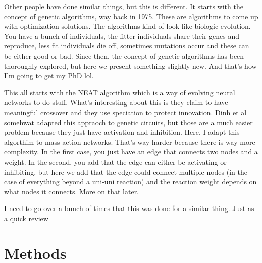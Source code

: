 \documentclass[12pt]{report}
\begin{document}
Other people have done similar things, but this is different. It starts with the concept of genetic algorithms, way back in 1975. These are algorithms to come up with optimization solutions. The algorithms kind of look like biologic evolution. You have a bunch of individuals, the fitter individuals share their genes and reproduce, less fit individuals die off, sometimes mutations occur and these can be either good or bad. Since then, the concept of genetic algorithms has been thoroughly explored, but here we present something slightly new. And that's how I'm going to get my PhD lol.

This all starts with the NEAT algorithm which is a way of evolving neural networks to do stuff.  What's interesting about this is they claim to have meaningful crossover and they use speciation to protect innovation. Dinh et al somehwat adapted this appraoch to genetic circuits, but those are a much easier problem because they just have activation and inhibition. Here, I adapt this algorthim to mass-action networks. That's way harder because there is way more complexity. In the first case, you just have an edge that connects two nodes and a weight. In the second, you add that the edge can either be activating or inhibiting, but here we add that the edge could connect multiple nodes (in the case of everything beyond a uni-uni reaction) and the reaction weight depends on what nodes it connects. More on that later.

I need to go over a bunch of times that this was done for a similar thing. Just as a quick review




\section{Methods}
\end{document}
